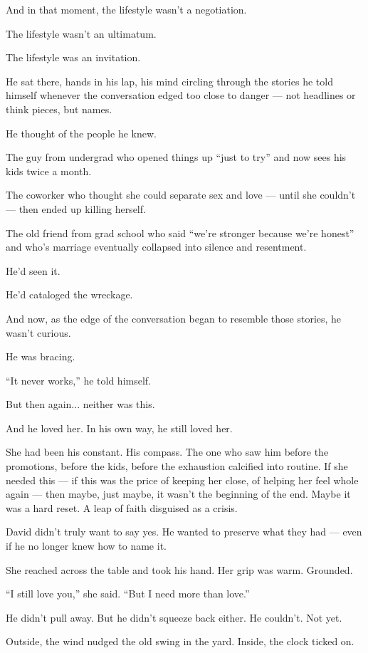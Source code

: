 And in that moment, the lifestyle wasn’t a negotiation.

The lifestyle wasn’t an ultimatum.

The lifestyle was an invitation.

He sat there, hands in his lap, his mind circling through the stories he told himself 
whenever the conversation edged too close to danger —
not headlines or think pieces, but names.

He thought of the people he knew.

The guy from undergrad who opened things up ``just to try'' and 
now sees his kids twice a month.

The coworker who thought she could separate sex and love --- until she couldn't --- 
then ended up killing herself.

The old friend from grad school who said ``we’re stronger because we’re honest'' 
and who's marriage eventually collapsed into silence and resentment.

He’d seen it.

He’d cataloged the wreckage.

And now, as the edge of the conversation began to resemble those stories,
he wasn’t curious.

He was bracing.

``It never works,'' he told himself.

But then again... neither was this. 

And he loved her. In his own way, he still loved her.

She had been his constant. His compass. The one who saw him before the promotions, before the kids, 
before the exhaustion calcified into routine. If she needed this --- if this was the price of keeping 
her close, of helping her feel whole again --- then maybe, just maybe, it wasn’t the beginning of the 
end. Maybe it was a hard reset. A leap of faith disguised as a crisis.


David didn’t truly want to say yes.  
He wanted to preserve what they had — even if he no longer knew how to name it.

She reached across the table and took his hand. Her grip was warm. Grounded.

“I still love you,” she said. “But I need more than love.”

He didn’t pull away. But he didn’t squeeze back either. He couldn’t. Not yet.

Outside, the wind nudged the old swing in the yard. Inside, the clock ticked on.

